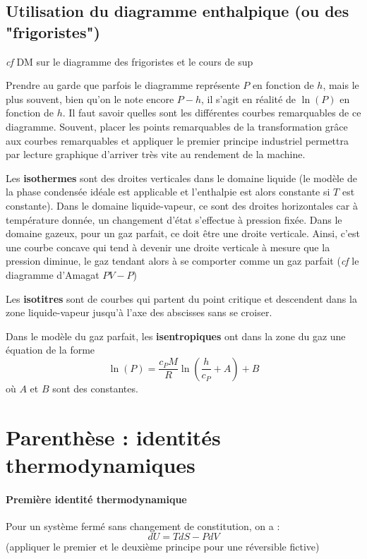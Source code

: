 \documentclass[french]{book}
\theoremstyle{plain}
\theoremstyle{definition}
\theoremstyle{remark}
\begin{document}
\subsection{Utilisation du diagramme enthalpique (ou des "frigoristes")}
\textit{cf} DM sur le diagramme des frigoristes et le cours de sup \\ \par Prendre au garde que parfois le diagramme représente $P$ en fonction de $h$, mais le plus souvent, bien qu'on le note encore $P-h$, il s'agit en réalité de $\ln(P)$ en fonction de $h$. Il faut savoir quelles sont les différentes courbes remarquables de ce diagramme. Souvent, placer les points remarquables de la transformation grâce aux courbes remarquables et appliquer le premier principe industriel permettra par lecture graphique d'arriver très vite au rendement de la machine. \\ \par Les \textbf{isothermes} sont des droites verticales dans le domaine liquide (le modèle de la phase condensée idéale est applicable et l'enthalpie est alors constante si $T$ est constante). Dans le domaine liquide-vapeur, ce sont des droites horizontales car à température donnée, un changement d'état s'effectue à pression fixée. Dans le domaine gazeux, pour un gaz parfait, ce doit être une droite verticale. Ainsi, c'est une courbe concave qui tend à devenir une droite verticale à mesure que la pression diminue, le gaz tendant alors à se comporter comme un gaz parfait (\textit{cf} le diagramme d'Amagat $PV-P$) \\ \par Les \textbf{isotitres} sont de courbes qui partent du point critique et descendent dans la zone liquide-vapeur jusqu'à l'axe des abscisses sans se croiser. \\ \par Dans le modèle du gaz parfait, les \textbf{isentropiques} ont dans la zone du gaz une équation de la forme $$\ln(P)=\frac{c_PM}{R}\ln\left(\frac{h}{c_P}+A\right)+B$$ où $A$ et $B$ sont des constantes.
\section{Parenthèse : identités thermodynamiques}
\paragraph{Première identité thermodynamique} Pour un système fermé sans changement de constitution, on a : $$dU=TdS-PdV$$ (appliquer le premier et le deuxième principe pour une réversible fictive)
\end{document}
